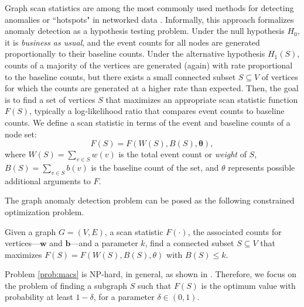 Graph scan statistics are among the most commonly used methods for detecting anomalies or ``hotspots" in
networked data \cite{Speakman-14,leiserson2015pan, hansen2016finding, neil2013scan, chen2014non}.
Informally, this approach formalizes anomaly detection as a hypothesis testing problem.
Under the null hypothesis $H_0$, it is \emph{business as usual}, and the event counts for all nodes are generated proportionally to their baseline counts. Under the alternative hypothesis $H_1(S)$, counts of a majority of
the vertices are generated (again) with rate proportional to the baseline counts, but there exists a small connected subset
$S \subseteq V$ of vertices for which the counts are generated at a higher rate than expected.
Then, the goal is to find a set of vertices $S$ that maximizes an appropriate scan statistic function $F(S)$, typically a log-likelihood ratio that compares event counts to baseline counts. We define a scan statistic in terms of the event and baseline counts of a node set:
$$
F(S) = F(W(S), B(S), \mathbf{\theta}),
$$
where $W(S) = \sum_{v \in S} w(v)$ is the total event count or \emph{weight} of $S$, $B(S) = \sum_{v \in S} b(v)$ is the baseline count of the set, and $\theta$ represents possible additional arguments to $F$.

The graph anomaly detection problem can be posed as the following constrained optimization problem.

\begin{problem}
\label{prob:macs}
Given a graph $G=(V, E)$, a scan statistic $F(\cdot)$, the associated counts for vertices---$\mathbf{w}$ and $\mathbf{b}$---and a parameter $k$, find a connected subset $S\subseteq V$ that maximizes $F(S) = F(W(S), B(S), \theta)$ with $B(S) \leq k$.
\end{problem}

Problem \ref{prob:macs} is NP-hard, in general, as shown in \cite{cadena:sdm17}. Therefore, we focus on the problem of finding a subgraph $S$ such that $F(S)$ is the optimum value with probability at least $1-\delta$, for a parameter $\delta\in(0, 1)$.

